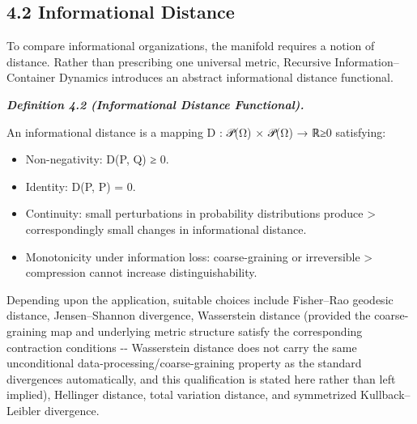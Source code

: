 \documentclass[
]{article}
\begin{document}
\hypertarget{informational-distance}{%
\subsection{4.2 Informational Distance}\label{informational-distance}}

To compare informational organizations, the manifold requires a notion
of distance. Rather than prescribing one universal metric, Recursive
Information--Container Dynamics introduces an abstract informational
distance functional.

\emph{\textbf{Definition 4.2 (Informational Distance Functional).}}

An informational distance is a mapping D : 𝒫(Ω) × 𝒫(Ω) → ℝ≥0 satisfying:

\begin{itemize}
\item
  Non-negativity: D(P, Q) ≥ 0.
\item
  Identity: D(P, P) = 0.
\item
  Continuity: small perturbations in probability distributions produce
  \textgreater{} correspondingly small changes in informational
  distance.
\item
  Monotonicity under information loss: coarse-graining or irreversible
  \textgreater{} compression cannot increase distinguishability.
\end{itemize}

Depending upon the application, suitable choices include Fisher--Rao
geodesic distance, Jensen--Shannon divergence, Wasserstein distance
(provided the coarse-graining map and underlying metric structure
satisfy the corresponding contraction conditions -\/- Wasserstein
distance does not carry the same unconditional
data-processing/coarse-graining property as the standard divergences
automatically, and this qualification is stated here rather than left
implied), Hellinger distance, total variation distance, and symmetrized
Kullback--Leibler divergence.
\end{document}
